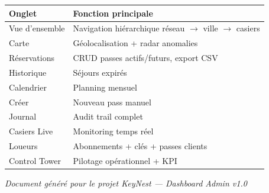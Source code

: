 \documentclass[11pt,a4paper]{article}
\begin{document}
\begin{center}
\small
\begin{tabular}{p{3.2cm}p{9.5cm}}
  \toprule
  \textbf{Onglet} & \textbf{Fonction principale} \\
  \midrule
  Vue d'ensemble & Navigation hiérarchique réseau $\rightarrow$ ville $\rightarrow$ casiers \\
  Carte & Géolocalisation + radar anomalies \\
  Réservations & CRUD passes actifs/futurs, export CSV \\
  Historique & Séjours expirés \\
  Calendrier & Planning mensuel \\
  Créer & Nouveau pass manuel \\
  Journal & Audit trail complet \\
  Casiers Live & Monitoring temps réel \\
  Loueurs & Abonnements + clés + passes clients \\
  Control Tower & Pilotage opérationnel + KPI \\
  \bottomrule
\end{tabular}
\end{center}

\vfill
\begin{center}
  \small\textit{Document généré pour le projet KeyNest — Dashboard Admin v1.0}
\end{center}
\end{document}
